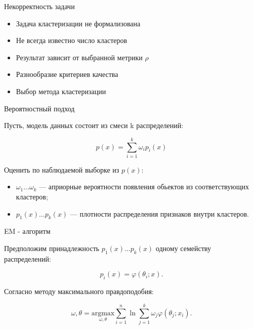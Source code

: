\documentclass{beamer}
\begin{document}

\begin{frame}{Некорректность задачи}

    \begin{itemize}
    
    \item Задача кластеризации не формализована
    
    \item Не всегда известно число кластеров
    
    \item Результат зависит от выбранной метрики $\rho$
    
    \item Разнообразие критериев качества
    
    \item Выбор метода кластеризации

    \end{itemize}
    
    \end{frame}



\begin{frame}{Вероятностный подход}

Пусть, модель данных состоит из смеси k распределений:

$$
p(x) = \sum\limits_{i=1}^k \omega_{i} p_{i}(x)
$$


Оценить по наблюдаемой выборке из $p(x)$:

\begin{itemize}
\item $\omega_{1}\ldots \omega_{k}$ --- априорные вероятности появления обьектов из соответствующих кластеров;

\item $p_{1}(x)\ldots p_{k}(x)$ --- плотности распределения признаков внутри кластеров.
\end{itemize}
\end{frame}


\begin{frame}{EM - алгоритм}


Предположим принадлежность $p_{1}(x)\ldots p_{k}(x)$ одному семейству распределений:

$$
p_{i}(x) = \varphi(\theta_{i}; x).
$$

Согласно методу максимального правдоподобия:

$$
\omega, \theta =  \underset{\omega, \theta}{\text{argmax}} \sum\limits_{i=1}^n \ln  \sum\limits_{j=1}^k \omega_{j} \varphi(\theta_{j}; x_{i}).
$$
\end{frame}
\end{document}
